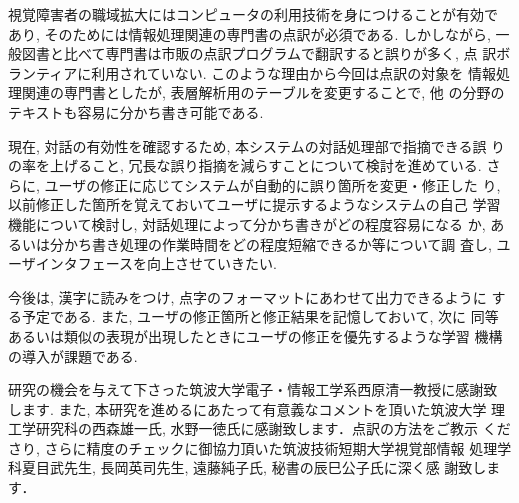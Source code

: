 視覚障害者の職域拡大にはコンピュータの利用技術を身につけることが有効で
あり, そのためには情報処理関連の専門書の点訳が必須である. しかしながら, 
一般図書と比べて専門書は市販の点訳プログラムで翻訳すると誤りが多く, 点
訳ボランティアに利用されていない. このような理由から今回は点訳の対象を
情報処理関連の専門書としたが, 表層解析用のテーブルを変更することで, 他
の分野のテキストも容易に分かち書き可能である. 

現在, 対話の有効性を確認するため, 本システムの対話処理部で指摘できる誤
りの率を上げること, 冗長な誤り指摘を減らすことについて検討を進めている. 
さらに, ユーザの修正に応じてシステムが自動的に誤り箇所を変更・修正した
り, 以前修正した箇所を覚えておいてユーザに提示するようなシステムの自己
学習機能について検討し, 対話処理によって分かち書きがどの程度容易になる
か, あるいは分かち書き処理の作業時間をどの程度短縮できるか等について調
査し, ユーザインタフェースを向上させていきたい. 

今後は, 漢字に読みをつけ, 点字のフォーマットにあわせて出力できるように
する予定である. また, ユーザの修正箇所と修正結果を記憶しておいて, 次に
同等あるいは類似の表現が出現したときにユーザの修正を優先するような学習
機構の導入が課題である. 

\newpage

\acknowledgment

研究の機会を与えて下さった筑波大学電子・情報工学系西原清一教授に感謝致
します. また, 本研究を進めるにあたって有意義なコメントを頂いた筑波大学
理工学研究科の西森雄一氏, 水野一徳氏に感謝致します．点訳の方法をご教示
くださり, さらに精度のチェックに御協力頂いた筑波技術短期大学視覚部情報
処理学科夏目武先生, 長岡英司先生, 遠藤純子氏, 秘書の辰巳公子氏に深く感
謝致します．




